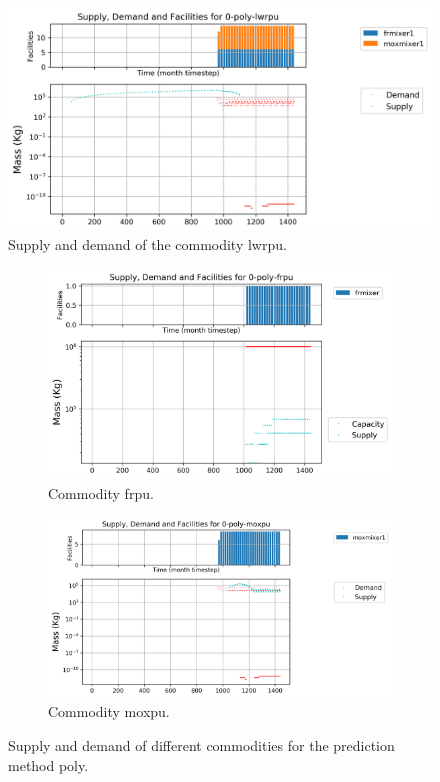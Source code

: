\documentclass[11pt]{article}
\begin{document}
\begin{figure}[!h]
	\centering
	\includegraphics[width=\textwidth]{29-figures/0-poly-lwrpu.png} 
	\hfill
	\caption{Supply and demand of the commodity lwrpu.}
	\label{fig:29-pu1}
\end{figure}

\begin{figure}[]
	\centering
	\begin{subfigure}[t]{0.45\textwidth}
		\centering
		\includegraphics[width=\linewidth]{23-figures/0-poly-frpu.png} 
		\caption{Commodity frpu.}
		\label{fig:29-frpu}
	\end{subfigure}
	\vspace{1cm}
	\begin{subfigure}[t]{0.45\textwidth}
		\centering
		\includegraphics[width=\linewidth]{29-figures/0-poly-moxpu.png} 
		\caption{Commodity moxpu.}
		\label{fig:29-moxpu}
	\end{subfigure}
	\hfill
	\caption{Supply and demand of different commodities for the prediction method poly.}
	\label{fig:29-pu2}
\end{figure}
\end{document}
